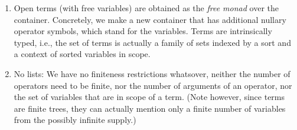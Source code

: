 {\begin{enumerate}
    In particular, there is no such thing as ``all models''; rather we
    can only quantify over models of a certain maximum size.
    The completeness theorem consequently does not require validity of
    an entailment in all models, but only in all models of a certain
    size, which is given by the size of the generic model, i.e., the
    term model.  The size of the term model in turn is determined by
    the size of the signature of the multi-sorted algebra.

  \item Open terms (with free variables) are obtained as the
    \emph{free monad} over the container.  Concretely, we make a new
    container that has additional nullary operator symbols, which
    stand for the variables.
    Terms are intrinsically typed, i.e., the set of terms is actually
    a family of sets indexed by a sort and a context of sorted
    variables in scope.

  \item No lists:
    We have no finiteness restrictions whatsover, neither the number
    of operators need to be finite, nor the number of arguments of an
    operator, nor the set of variables that are in scope of a term.
    (Note however, since terms are finite trees, they can actually
    mention only a finite number of variables from the possibly
    infinite supply.)

  \end{enumerate}
}
%
